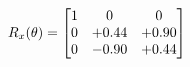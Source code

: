 \documentclass[preview]{standalone}
\begin{document}
\begin{align*}
\special{dvisvgm:raw <g id='unique000'>}R_{x}(\theta) = \begin{bmatrix}1 & 0 & 0 \\0 & +0.44 & +0.90 \\0 & -0.90 & +0.44\end{bmatrix}\special{dvisvgm:raw </g>}
\end{align*}
\end{document}
